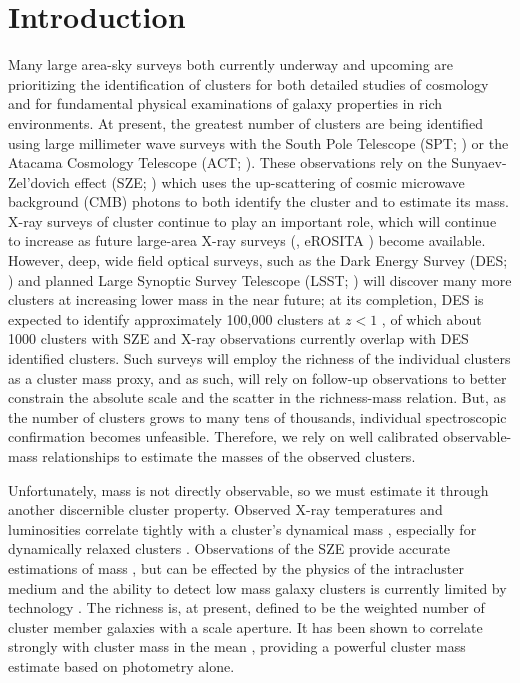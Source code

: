 \section{Introduction} 
Many large area-sky surveys both currently underway and upcoming are prioritizing the identification of clusters for both detailed studies of cosmology and for fundamental physical examinations of galaxy properties in rich environments. At present, the greatest number of clusters are being identified using large millimeter wave surveys with the South Pole Telescope (SPT; \citealt{Carlstrom2011}) or the Atacama Cosmology Telescope (ACT; \citealt{Swetz2011}). These observations rely on the Sunyaev-Zel'dovich effect (SZE; \citealt{Sunyaev1972}) which uses the up-scattering of cosmic microwave background (CMB) photons to both identify the cluster and to estimate its mass. X-ray surveys of cluster  continue to play an important role, which will continue to increase as future large-area X-ray surveys (\eg, eROSITA \citealt{Merloni2012}) become available. However, deep, wide field optical surveys, such as the Dark Energy Survey (DES; \citealt{DES2005}) and planned Large Synoptic Survey Telescope (LSST; \citealt{LSST2012}) will discover many more clusters at increasing lower mass in the near future; at its completion, DES is expected to identify approximately 100,000 clusters at $z<1$ \citep{DarkEnergySurveyCollaboration2016}, of which about 1000 clusters with SZE and X-ray observations currently overlap with DES identified clusters. Such surveys will employ the richness of the individual clusters as a cluster mass proxy, and as such, will rely on follow-up observations to better constrain the absolute scale and the scatter in the richness-mass relation. But, as the number of clusters grows to many tens of thousands, individual spectroscopic confirmation becomes unfeasible. Therefore, we rely on well calibrated observable-mass relationships to estimate the masses of the observed clusters.

Unfortunately, mass is not directly observable, so we must estimate it through another discernible cluster property. Observed X-ray temperatures and luminosities correlate tightly with a cluster's dynamical mass , especially for dynamically relaxed clusters . Observations of the SZE provide accurate estimations of mass , but can be effected by the physics of the intracluster medium  and the ability to detect low mass galaxy clusters is currently limited by technology . The richness  is, at present, defined to be the weighted number of cluster member galaxies with a scale aperture. It has been shown to correlate strongly with cluster mass in the mean , providing a powerful cluster mass estimate based on photometry alone.

